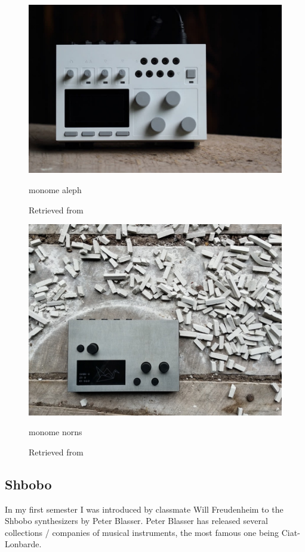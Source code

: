 \begin{figure}[ht]
  \centering
  \includegraphics[width=0.75\linewidth,height=0.25\textheight,keepaspectratio]{images/monome-aleph.jpg}
  \caption{monome aleph}
  \caption*{Retrieved from \cite{website-monome-current}}
  \label{fig:monome-aleph}
\end{figure}

\begin{figure}[ht]
  \centering
  \includegraphics[width=0.75\linewidth,height=0.25\textheight,keepaspectratio]{images/monome-norns.jpg}
  \caption{monome norns}
  \caption*{Retrieved from \cite{website-monome-current}}
  \label{fig:monome-norns}
\end{figure}

\subsection{Shbobo}

In my first semester I was introduced by classmate Will Freudenheim to the Shbobo synthesizers by Peter Blasser. Peter Blasser has released several collections / companies of musical instruments, the most famous one being Ciat-Lonbarde.

